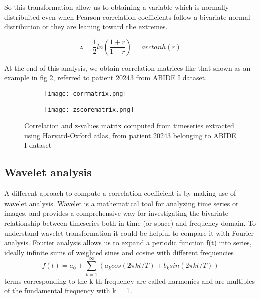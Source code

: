 \documentclass[a4paper,11pt]{article}
\begin{document}
So this transformation allow us to obtaining a variable which is normally distribuited even when Pearson correlation coefficients follow a bivariate normal distribution or they are leaning toward the extremes.

\begin{equation}
z = \frac{1}{2}ln\left(\frac{1+r}{1-r}\right) = arctanh(r)
\end{equation}

At the end of this analysis, we obtain correlation matrices like that shown as an example in fig \ref{fig:corrmatrices}, referred to patient 20243 from ABIDE I dataset.
\begin{figure}
\begin{subfigure}{0.5\textwidth}
\texttt{[image: corrmatrix.png]}
\caption{}
\label{ref:corrmatrix}
\end{subfigure}
\begin{subfigure}{0.5\textwidth}
\texttt{[image: zscorematrix.png]}
\end{subfigure}
\caption{Correlation and z-values matrix computed from timeseries extracted using Harvard-Oxford atlas, from patient 20243 belonging to ABIDE I dataset}
\label{fig:corrmatrices}
\end{figure}



\subsection{Wavelet analysis}
A different aproach to compute a correlation coefficient is by making use of wavelet analysis.
Wavelet is a mathematical tool for analyzing time series or images, and provides a comprehensive way for investigating the bivariate relationship between timeseries both in time (or space) and frequency domain.
To understand wavelet transformation it could be helpful to compare it with Fourier analysis.
Fourier analysis allows us to expand a periodic function f(t) into series, ideally infinite sums of weighted sines and cosine with different frequencies
\begin{equation}
f(t) = a_0 + \sum_{k = 1}^\infty (a_k cos(2\pi k t/T) + b_k sin (2\pi k t /T))
\end{equation}
terms corresponding to the k-th frequency are called harmonics and are multiples of the fundamental frequency with k = 1.
\end{document}
